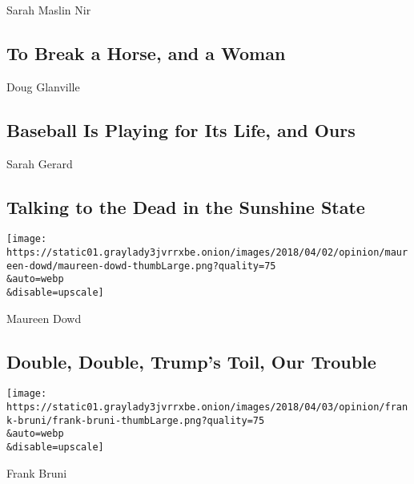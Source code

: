 \href{/2020/08/02/sunday-review/horse-crazy-nir-language.html}{}

Sarah Maslin Nir

\hypertarget{to-break-a-horse-and-a-woman}{%
\subsection{To Break a Horse, and a
Woman}\label{to-break-a-horse-and-a-woman}}

\href{/2020/08/02/opinion/baseball-coronavirus-Marlins.html}{}

Doug Glanville

\hypertarget{baseball-is-playing-for-its-life-and-ours}{%
\subsection{Baseball Is Playing for Its Life, and
Ours}\label{baseball-is-playing-for-its-life-and-ours}}

\href{/2020/08/01/opinion/spiritualism-cassadaga-florida.html}{}

Sarah Gerard

\hypertarget{talking-to-the-dead-in-the-sunshine-state}{%
\subsection{Talking to the Dead in the Sunshine
State}\label{talking-to-the-dead-in-the-sunshine-state}}

\href{/2020/08/01/opinion/sunday/trump-coronavirus-herman-cain.html}{}

\texttt{[image: https://static01.graylady3jvrrxbe.onion/images/2018/04/02/opinion/maureen-dowd/maureen-dowd-thumbLarge.png?quality=75\\\&auto=webp\\\&disable=upscale]}

Maureen Dowd

\hypertarget{double-double-trumps-toil-our-trouble}{%
\subsection{Double, Double, Trump's Toil, Our
Trouble}\label{double-double-trumps-toil-our-trouble}}

\href{/2020/08/01/opinion/sunday/minerva-college-coronavirus.html}{}

\texttt{[image: https://static01.graylady3jvrrxbe.onion/images/2018/04/03/opinion/frank-bruni/frank-bruni-thumbLarge.png?quality=75\\\&auto=webp\\\&disable=upscale]}

Frank Bruni

